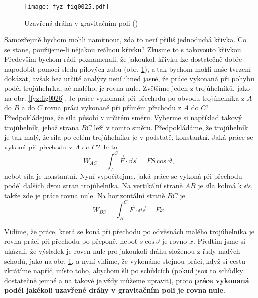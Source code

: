     \begin{figure}[ht!]  %
      \centering
      \texttt{[image: fyz\_fig0025.pdf]}
      \caption{Uzavřená dráha v gravitačním poli (\cite[s.~190]{Feynman01})}
      \label{fyz:fig0025}
    \end{figure}
    Samozřejmě bychom mohli namítnout, zda to není příliš jednoduchá křivka. Co se stane, 
    použijeme-li nějakou reálnou křivku? Zkusme to s takovouto křivkou. Především bychom rádi 
    poznamenali, že jakoukoli křivku lze dostatečně dobře napodobit pomocí sledu pilových zubů 
    (obr. \ref{fyz:fig0025}), a tak bychom mohli naše tvrzení dokázat, avšak bez určité analýzy není 
    ihned jasné, že práce vykonaná při pohybu podél trojúhelníka, ač malého, je rovna nule. 
    Zvětšíme jeden z trojúhelníků, jako na obr. \ref{fyz:fig0026}. Je práce vykonaná při přechodu po 
    obvodu trojúhelníka z \(A\) do \(B\) a do \(C\) rovna práci vykonané při přímém přechodu z 
    \(A\) do \(C\)? Předpokládejme, že síla působí v určitém směru. Vyberme si například takový 
    trojúhelník, jehož strana \(BC\) leží v tomto směru. Předpokládáme, že trojúhelník je tak malý, 
    že síla po celém trojúhelníku je v podstatě, konstantní. Jaká práce se vykoná při přechodu z 
    \(A\) do \(C\)? Je to
    \begin{equation*}
      W_{AC} = \int_A^C\vec{F}\cdot\dd{\vec{s}} = FS\cos\vartheta,
    \end{equation*} 
    neboť síla je konstantní. Nyní vypočítejme, jaká práce se vykoná při přechodu podél dalších 
    dvou stran trojúhelníka. Na vertikální straně \(AB\) je síla kolmá k \(\dd{s}\), takže zde je 
    práce rovna nule. Na horizontální straně \(BC\) je
    \begin{equation}\label{fyz:eq044}
      W_{BC} = \int_B^C\vec{F}\cdot\dd{\vec{s}} = Fx.
    \end{equation} 

    Vidíme, že práce, která se koná při přechodu po odvěsnách malého trojúhelníka je rovna práci 
    při přechodu po přeponě, neboť \(s\cos\vartheta\) je rovno \(x\). Předtím jsme si ukázali, že 
    výsledek je roven nule pro jakoukoli dráhu složenou z řady malých schodů, jako na obr. 
    \ref{fyz:fig0025}, a nyní vidíme, že vykonáme stejnou práci, když si cestu zkrátíme napříč, 
    místo toho, abychom šli po schůdcích (pokud jsou to schůdky dostatečně jemné a na takové je 
    vždy můžeme upravit), proto \textbf{práce vykonaná podél jakékoli uzavřené dráhy v gravitačním 
    poli je rovna nule}.
    
